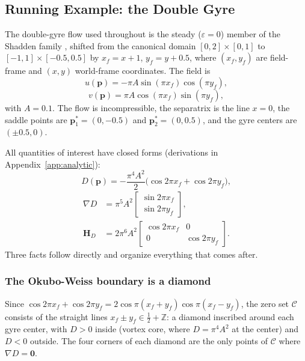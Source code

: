 \documentclass[lettersize,journal]{IEEEtran}
\begin{document}
\subsection{Running Example: the Double Gyre}
\label{sec:dg_example}

The double-gyre flow used throughout is the steady ($\varepsilon = 0$)
member of the Shadden family \cite{8}, shifted from the canonical domain
$[0,2] \times [0,1]$ to $[-1,1] \times [-0.5, 0.5]$ by
$x_f = x + 1$, $y_f = y + 0.5$, where $(x_f, y_f)$ are field-frame and
$(x, y)$ world-frame coordinates. The field is
\begin{equation}
    u(\mathbf{p}) = -\pi A \sin(\pi x_f) \cos(\pi y_f), \label{eq:dg_u}
\end{equation}
\begin{equation}
    v(\mathbf{p}) = \pi A \cos(\pi x_f) \sin(\pi y_f), \label{eq:dg_v}
\end{equation}
with $A = 0.1$. The flow is incompressible, the separatrix is the line
$x = 0$, the saddle points are $\mathbf{p}^*_1 = (0, -0.5)$ and
$\mathbf{p}^*_2 = (0, 0.5)$, and the gyre centers are $(\pm 0.5, 0)$.

All quantities of interest have closed forms (derivations in
Appendix~\ref{app:analytic}):
\begin{equation}
    D(\mathbf{p}) = -\frac{\pi^4 A^2}{2}
    \bigl(\cos 2\pi x_f + \cos 2\pi y_f\bigr),
    \label{eq:det_analytic_main}
\end{equation}
\begin{equation}
    \begin{aligned}
    \nabla D &= \pi^5 A^2
    \begin{bmatrix} \sin 2\pi x_f \\ \sin 2\pi y_f \end{bmatrix},
    \\
    \mathbf{H}_D &= 2\pi^6 A^2
    \begin{bmatrix} \cos 2\pi x_f & 0 \\ 0 & \cos 2\pi y_f \end{bmatrix}.
    \end{aligned}
    \label{eq:gradhess_analytic_main}
\end{equation}
Three facts follow directly and organize everything that comes after.

\subsubsection{The Okubo-Weiss boundary is a diamond}
Since $\cos 2\pi x_f + \cos 2\pi y_f = 2\cos\pi(x_f + y_f)\cos\pi(x_f -
y_f)$, the zero set $\mathcal{C}$ consists of the straight lines
$x_f \pm y_f \in \tfrac{1}{2} + \mathbb{Z}$: a diamond inscribed around
each gyre center, with $D > 0$ inside (vortex core, where $D = \pi^4 A^2$
at the center) and $D < 0$ outside. The four corners of each diamond are
the only points of $\mathcal{C}$ where $\nabla D = \mathbf{0}$.
\end{document}
